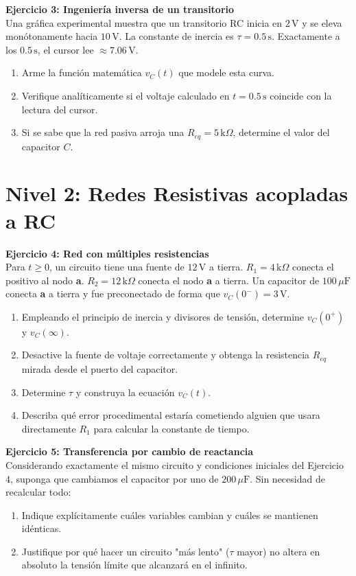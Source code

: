 \documentclass[11pt, a4paper]{article}
\begin{document}
\vspace{0.2cm}
\textbf{Ejercicio 3: Ingeniería inversa de un transitorio}\\
Una gráfica experimental muestra que un transitorio RC inicia en $2\,\text{V}$ y se eleva monótonamente hacia $10\,\text{V}$. La constante de inercia es $\tau = 0.5\,\text{s}$. Exactamente a los $0.5\,\text{s}$, el cursor lee $\approx 7.06\,\text{V}$.
\begin{enumerate}
    \item Arme la función matemática $v_C(t)$ que modele esta curva.
    \item Verifique analíticamente si el voltaje calculado en $t=0.5\,\text{s}$ coincide con la lectura del cursor.
    \item Si se sabe que la red pasiva arroja una $R_{eq} = 5\,\text{k}\Omega$, determine el valor del capacitor $C$.
\end{enumerate}

\vspace{0.3cm}
\section*{Nivel 2: Redes Resistivas acopladas a RC}

\textbf{Ejercicio 4: Red con múltiples resistencias}\\
Para $t \ge 0$, un circuito tiene una fuente de $12\,\text{V}$ a tierra. $R_1=4\,\text{k}\Omega$ conecta el positivo al nodo \textbf{a}. $R_2=12\,\text{k}\Omega$ conecta el nodo \textbf{a} a tierra. Un capacitor de $100\,\mu\text{F}$ conecta \textbf{a} a tierra y fue preconectado de forma que $v_C(0^-) = 3\,\text{V}$.
\begin{enumerate}
    \item Empleando el principio de inercia y divisores de tensión, determine $v_C(0^+)$ y $v_C(\infty)$.
    \item Desactive la fuente de voltaje correctamente y obtenga la resistencia $R_{eq}$ mirada desde el puerto del capacitor.
    \item Determine $\tau$ y construya la ecuación $v_C(t)$.
    \item Describa qué error procedimental estaría cometiendo alguien que usara directamente $R_1$ para calcular la constante de tiempo.
\end{enumerate}

\vspace{0.2cm}
\textbf{Ejercicio 5: Transferencia por cambio de reactancia}\\
Considerando exactamente el mismo circuito y condiciones iniciales del Ejercicio 4, suponga que cambiamos el capacitor por uno de $200\,\mu\text{F}$. Sin necesidad de recalcular todo: 
\begin{enumerate}
    \item Indique explícitamente cuáles variables cambian y cuáles se mantienen idénticas.
    \item Justifique por qué hacer un circuito "más lento" ($\tau$ mayor) no altera en absoluto la tensión límite que alcanzará en el infinito.
\end{enumerate}
\end{document}
